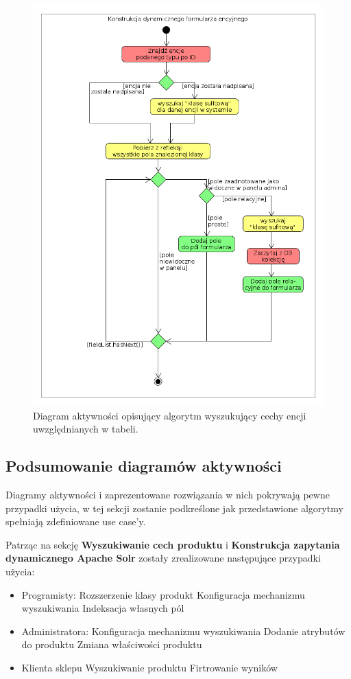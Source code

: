 \begin{figure}
	\begin{center}
		\includegraphics[scale=0.5]{konsFormEnc.png}
	\end{center}
	\caption{{\color{black}Diagram aktywności opisujący algorytm wyszukujący cechy encji uwzględnianych w tabeli.}} \label{konsFormEnc}
\end{figure}

\subsection{Podsumowanie diagramów aktywności}
Diagramy aktywności i zaprezentowane rozwiązania w nich pokrywają pewne przypadki użycia, w tej sekcji zostanie podkreślone jak przedstawione algorytmy spełniają zdefiniowane use case'y.

Patrząc na sekcję \textbf{Wyszukiwanie cech produktu} i \textbf{Konstrukcja zapytania dynamicznego Apache Solr} zostały zrealizowane następujące przypadki użycia:
\begin{itemize}
	\item Programisty: 
	\subitem Rozszerzenie klasy produkt
	\subitem Konfiguracja mechanizmu wyszukiwania
	\subitem Indeksacja własnych pól
	\item Administratora:
	\subitem Konfiguracja mechanizmu wyszukiwania
	\subitem Dodanie atrybutów do produktu
	\subitem Zmiana właściwości produktu
	\item Klienta sklepu
	\subitem Wyszukiwanie produktu
	\subitem Firtrowanie wyników
\end{itemize}


